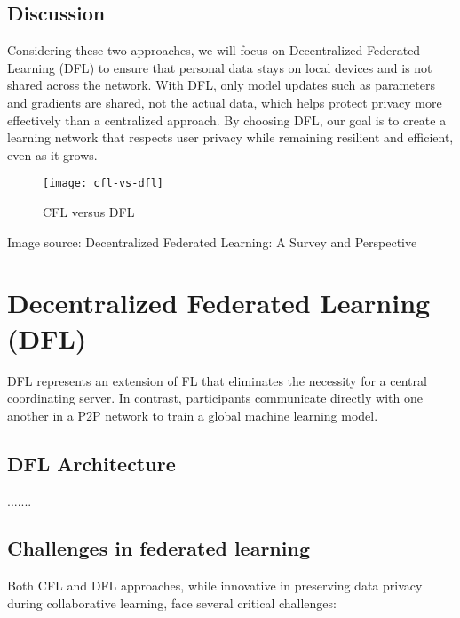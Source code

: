 \subsection{Discussion}
\label{sub:discussion}

Considering these two approaches, we will focus on Decentralized Federated Learning (\gls{DFL}) to ensure that personal data stays on local devices and is not shared across the network. With \gls{DFL}, only model updates such as parameters and gradients are shared, not the actual data, which helps protect privacy more effectively than a centralized approach.
By choosing \gls{DFL}, our goal is to create a learning network that respects user privacy while remaining resilient and efficient, even as it grows.

\begin{figure}[htbp]
  \centering
  \texttt{[image: cfl-vs-dfl]}
  \caption{CFL versus DFL}
  \label{fig:dfl_vs_cfl}
\end{figure}

Image source: Decentralized Federated Learning: A Survey and Perspective

\section{Decentralized Federated Learning (DFL)}
\label{sub:decentralized_federated_learning_2}

\gls{DFL} represents an extension of \gls{FL} that eliminates the necessity for a central coordinating server. In contrast, participants communicate directly with one another in a \gls{P2P} network to train a global machine learning model. 

\subsection{\gls{DFL} Architecture}
\label{sub:dfl_architecture}

.......

\subsection{Challenges in federated learning}
\label{sub:challenges_in_fl}

Both CFL and DFL approaches, while innovative in preserving data privacy during collaborative learning, face several critical challenges:

